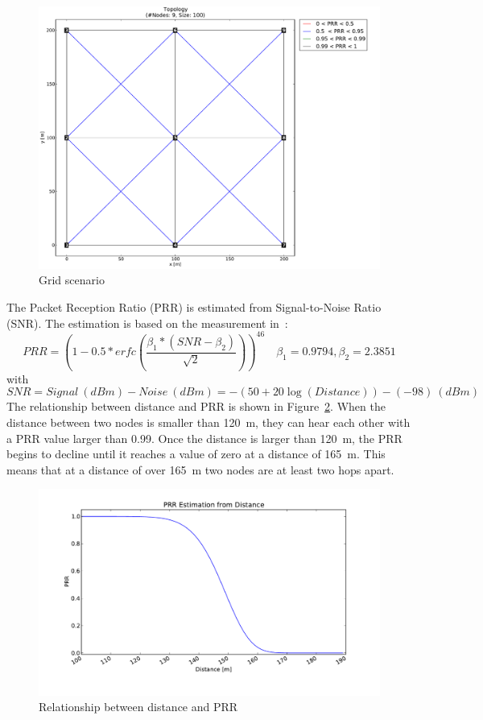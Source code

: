 \begin{figure}[htpb]	
  	\centering
    \leavevmode
      \includegraphics[scale=0.35]{Pics/results/topo9_dist100_grid.pdf}
    \caption{Grid scenario}
    \label{fig:scenario_grid}
\end{figure}

The Packet Reception Ratio (PRR) is estimated from Signal-to-Noise Ratio (SNR). The estimation is based on the measurement in~\cite{RL08}:
\[
PRR = (1-0.5*erfc(\frac{\beta_1*(SNR-\beta_2)}{\sqrt{2}}))^{46}
\quad{\beta_1} = 0.9794, {\beta_2} = 2.3851
\] 
with 
\[
SNR = Signal\:(dBm)- Noise\:(dBm) = -(50 + 20 {\log}(Distance)) - (-98)\:(dBm)
\] 
The relationship between distance and PRR is shown in Figure~\ref{fig:prr}. When the distance between two nodes is smaller than 120~m, they can hear each other with a PRR value larger than 0.99. Once the distance is larger than 120~m, the PRR begins to decline until it reaches a value of zero at a distance of 165~m.  This means that at a distance of over 165~m two nodes are at least two hops apart.

\begin{figure}[htbp]
  \begin{center}
    \leavevmode
      \includegraphics[scale=0.45]{Pics/prr.pdf}
   \caption{Relationship between distance and PRR}
    \label{fig:prr}
  \end{center}
\end{figure}

